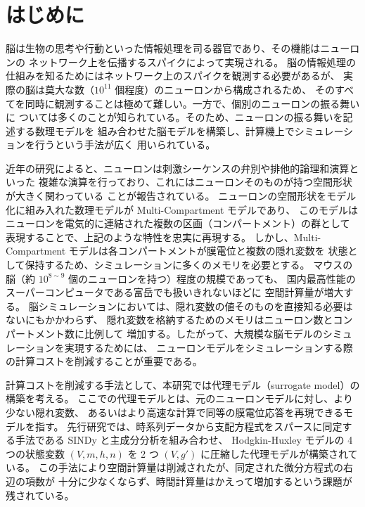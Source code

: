 \documentclass[a4paper,11pt,openany]{ltjsreport}
\begin{document}
\chapter{はじめに}

脳は生物の思考や行動といった情報処理を司る器官であり、その機能はニューロンの
ネットワーク上を伝播するスパイクによって実現される\cite{yamazaki2021}。
脳の情報処理の仕組みを知るためにはネットワーク上のスパイクを観測する必要があるが、
実際の脳は莫大な数（$10^{11}$ 個程度\cite{kandel2022}）のニューロンから構成されるため、
そのすべてを同時に観測することは極めて難しい。一方で、個別のニューロンの振る舞いに
ついては多くのことが知られている。そのため、ニューロンの振る舞いを記述する数理モデルを
組み合わせた脳モデルを構築し、計算機上でシミュレーションを行うという手法が広く
用いられている。

近年の研究によると、ニューロンは刺激シーケンスの弁別や排他的論理和演算といった
複雑な演算を行っており、これにはニューロンそのものが持つ空間形状が大きく関わっている
ことが報告されている\cite{gidon2020,branco2010}。
ニューロンの空間形状をモデル化に組み入れた数理モデルが Multi-Compartment モデルであり、
このモデルはニューロンを電気的に連結された複数の区画（コンパートメント）の群として
表現することで、上記のような特性を忠実に再現する。
しかし、Multi-Compartment モデルは各コンパートメントが膜電位と複数の隠れ変数を
状態として保持するため、シミュレーションに多くのメモリを必要とする\cite{yamazaki2021}。
マウスの脳（約 $10^{8\sim9}$ 個のニューロンを持つ）程度の規模であっても、
国内最高性能のスーパーコンピュータである富岳でも扱いきれないほどに
空間計算量が増大する\cite{kobayashi2024}。
脳シミュレーションにおいては、隠れ変数の値そのものを直接知る必要はないにもかかわらず、
隠れ変数を格納するためのメモリはニューロン数とコンパートメント数に比例して
増加する。したがって、大規模な脳モデルのシミュレーションを実現するためには、
ニューロンモデルをシミュレーションする際の計算コストを削減することが重要である。

計算コストを削減する手法として、本研究では代理モデル（surrogate model）の構築を考える。
ここでの代理モデルとは、元のニューロンモデルに対し、より少ない隠れ変数、
あるいはより高速な計算で同等の膜電位応答を再現できるモデルを指す。
先行研究\cite{munechika2025}では、時系列データから支配方程式をスパースに同定する手法である
SINDy\cite{brunton2015} と主成分分析を組み合わせ、
Hodgkin-Huxley モデル\cite{hodgkin1952}の 4 つの状態変数 $(V, m, h, n)$ を
2 つ $(V, g')$ に圧縮した代理モデルが構築されている。
この手法により空間計算量は削減されたが、同定された微分方程式の右辺の項数が
十分に少なくならず、時間計算量はかえって増加するという課題が残されている。
\end{document}
